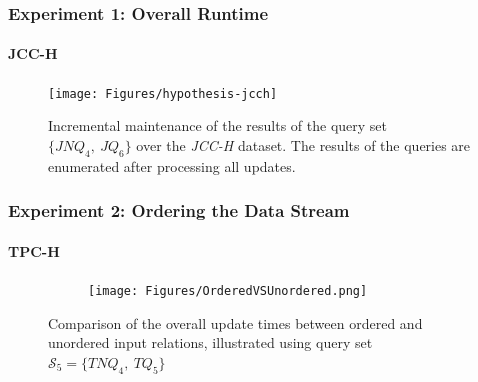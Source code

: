 \documentclass[
	11pt, %
]{beamer}
\begin{document}
\begin{frame}

	\frametitle{Experiment 1: Overall Runtime}
	\framesubtitle{JCC-H}
		\begin{figure}
			\begin{minipage}{0.25\textwidth}
			\end{minipage}
			\begin{minipage}{0.74\textwidth}
				\texttt{[image: Figures/hypothesis-jcch]} %
			\end{minipage}
		\caption{Incremental maintenance of the results of the query set  $\{JNQ_4,\ JQ_6\}$ over the  {\em JCC-H} dataset.
			The results of the queries are enumerated after processing all updates.
		}
		\label{fig:hypothesis}
	\end{figure}
	
\end{frame}


\begin{frame}
	\frametitle{Experiment 2: Ordering the Data Stream}
	\framesubtitle{TPC-H}
	\begin{figure}


		\begin{minipage}{0.25\textwidth}
		\end{minipage}
		\begin{minipage}{0.74\textwidth}
			\begin{figure}
				\centering
				\texttt{[image: Figures/OrderedVSUnordered.png]}
				
			\end{figure}
		\end{minipage}
		\caption{Comparison of the overall update times between ordered and unordered input relations, illustrated using query set $\mathcal{S}_5 = \{TNQ_4,\ TQ_5\}$}
		\label{fig:orderedVSunordered}
	\end{figure}
\end{frame}
\end{document}
